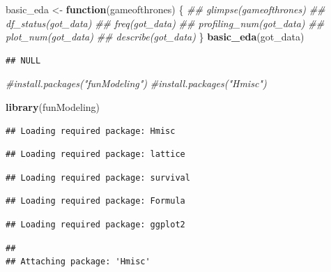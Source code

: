 \documentclass[]{article}
\newenvironment{Shaded}{\begin{snugshade}}{\end{snugshade}}
\newcommand{\CommentTok}[1]{\textcolor[rgb]{0.56,0.35,0.01}{\textit{#1}}}
\newcommand{\ControlFlowTok}[1]{\textcolor[rgb]{0.13,0.29,0.53}{\textbf{#1}}}
\newcommand{\KeywordTok}[1]{\textcolor[rgb]{0.13,0.29,0.53}{\textbf{#1}}}
\newcommand{\NormalTok}[1]{#1}
\newcommand{\StringTok}[1]{\textcolor[rgb]{0.31,0.60,0.02}{#1}}
\begin{document}
\begin{Shaded}
\begin{Highlighting}[]
\NormalTok{basic_eda <-}\StringTok{ }\ControlFlowTok{function}\NormalTok{(gameofthrones)}
\NormalTok{\{}
 \CommentTok{## glimpse(gameofthrones)}
 \CommentTok{## df_status(got_data)}
 \CommentTok{## freq(got_data) }
 \CommentTok{## profiling_num(got_data)}
\CommentTok{##  plot_num(got_data)}
 \CommentTok{## describe(got_data)}
\NormalTok{\}}
\KeywordTok{basic_eda}\NormalTok{(got_data)}
\end{Highlighting}
\end{Shaded}

\begin{verbatim}
## NULL
\end{verbatim}

\begin{Shaded}
\begin{Highlighting}[]
\CommentTok{#install.packages("funModeling")}
\CommentTok{#install.packages("Hmisc")}
\end{Highlighting}
\end{Shaded}

\begin{Shaded}
\begin{Highlighting}[]
\KeywordTok{library}\NormalTok{(funModeling)}
\end{Highlighting}
\end{Shaded}

\begin{verbatim}
## Loading required package: Hmisc
\end{verbatim}

\begin{verbatim}
## Loading required package: lattice
\end{verbatim}

\begin{verbatim}
## Loading required package: survival
\end{verbatim}

\begin{verbatim}
## Loading required package: Formula
\end{verbatim}

\begin{verbatim}
## Loading required package: ggplot2
\end{verbatim}

\begin{verbatim}
## 
## Attaching package: 'Hmisc'
\end{verbatim}
\end{document}
